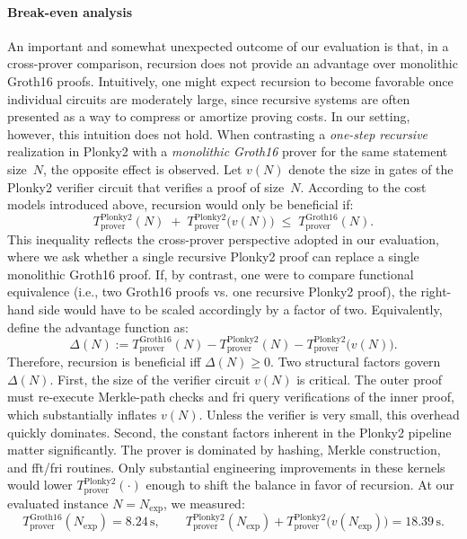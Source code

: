 \paragraph{Break-even analysis}  
An important and somewhat unexpected outcome of our evaluation is that, in a cross-prover comparison, recursion does not provide an advantage over monolithic Groth16 proofs. Intuitively, one might expect recursion to become favorable once individual circuits are moderately large, since recursive systems are often presented as a way to compress or amortize proving costs. In our setting, however, this intuition does not hold. When contrasting a \emph{one-step recursive} realization in Plonky2 with a \emph{monolithic Groth16} prover for the same statement size~$N$, the opposite effect is observed. Let $v(N)$ denote the size in gates of the Plonky2 verifier circuit that verifies a proof of size~$N$. According to the cost models introduced above, recursion would only be beneficial if:
\[
T_{\text{prover}}^{\text{Plonky2}}(N) \;+\;
T_{\text{prover}}^{\text{Plonky2}}\!\big(v(N)\big)
\;\le\;
T_{\text{prover}}^{\text{Groth16}}(N).
\]
This inequality reflects the cross-prover perspective adopted in our evaluation, where we ask whether a single recursive Plonky2 proof can replace a single monolithic Groth16 proof. If, by contrast, one were to compare functional equivalence (i.e., two Groth16 proofs vs. one recursive Plonky2 proof), the right-hand side would have to be scaled accordingly by a factor of two. Equivalently, define the advantage function as:
\[
\Delta(N)
:= T_{\text{prover}}^{\text{Groth16}}(N)
- T_{\text{prover}}^{\text{Plonky2}}(N)
- T_{\text{prover}}^{\text{Plonky2}}\!\big(v(N)\big).
\]
Therefore, recursion is beneficial iff $\Delta(N)\ge 0$. Two structural factors govern $\Delta(N)$. First, the size of the verifier circuit $v(N)$ is critical. The outer proof must re-execute Merkle-path checks and \acrshort{fri} query verifications of the inner proof, which substantially inflates $v(N)$. Unless the verifier is very small, this overhead quickly dominates. Second, the constant factors inherent in the Plonky2 pipeline matter significantly. The prover is dominated by hashing, Merkle construction, and \acrshort{fft}/\acrshort{fri} routines. Only substantial engineering improvements in these kernels would lower $T_{\text{prover}}^{\text{Plonky2}}(\cdot)$ enough to shift the balance in favor of recursion. At our evaluated instance $N=N_{\!\mathrm{exp}}$, we measured:
\[
T_{\text{prover}}^{\text{Groth16}}(N_{\!\mathrm{exp}})=8.24\,\text{s},\qquad
T_{\text{prover}}^{\text{Plonky2}}(N_{\!\mathrm{exp}})
+ T_{\text{prover}}^{\text{Plonky2}}\!\big(v(N_{\!\mathrm{exp}})\big)
= 18.39\,\text{s}.
\]
